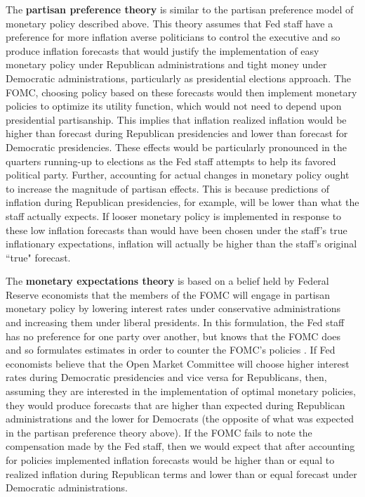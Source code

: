 \documentclass[a4paper]{article}\usepackage{graphicx, color}
\begin{document}
The {\bf{partisan preference theory}} is similar to the partisan preference model of monetary policy described above. This theory assumes that Fed staff have a preference for more inflation averse politicians to control the executive and so produce inflation forecasts that would justify the implementation of easy monetary policy under Republican administrations and tight money under Democratic administrations, particularly as presidential elections approach. The FOMC, choosing policy based on these forecasts would then implement monetary policies to optimize its utility function, which would not need to depend upon presidential partisanship. This implies that inflation realized inflation would be higher than forecast during Republican presidencies and lower than forecast for Democratic presidencies. These effects would be particularly pronounced in the quarters running-up to elections as the Fed staff attempts to help its favored political party. Further, accounting for actual changes in monetary policy ought to increase the magnitude of partisan effects. This is because predictions of inflation during Republican presidencies, for example, will be lower than what the staff actually expects. If looser monetary policy is implemented in response to these low inflation forecasts than would have been chosen under the staff's true inflationary expectations, inflation will actually be higher than the staff's original ``true" forecast.

The {\bf{monetary expectations theory}} is based on a belief held by Federal Reserve economists that the members of the FOMC will engage in partisan monetary policy by lowering interest rates under conservative administrations and increasing them under liberal presidents. In this formulation, the Fed staff has no preference for one party over another, but knows that the FOMC does and so formulates estimates in order to counter the FOMC's policies \citep{Clark2011}. If Fed economists believe that the Open Market Committee will choose higher interest rates during Democratic presidencies and vice versa for Republicans, then, assuming they are interested in the implementation of optimal monetary policies, they would produce forecasts that are higher than expected during Republican administrations and the lower for Democrats (the opposite of what was expected in the partisan preference theory above). If the FOMC fails to note the compensation made by the Fed staff, then we would expect that after accounting for policies implemented inflation forecasts would be higher than or equal to realized inflation during Republican terms and lower than or equal forecast under Democratic administrations. %
\end{document}
